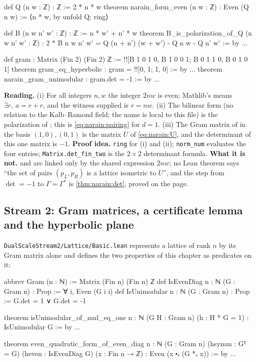 \begin{leancode}
def Q (n w : ℤ) : ℤ := 2 * n * w
theorem narain_form_even (n w : ℤ) : Even (Q n w) := ⟨n * w, by unfold Q; ring⟩

def B (n w n' w' : ℤ) : ℤ := n * w' + n' * w
theorem B_is_polarization_of_Q (n w n' w' : ℤ) :
    2 * B n w n' w' = Q (n + n') (w + w') - Q n w - Q n' w' := by ...

def gram : Matrix (Fin 2) (Fin 2) ℤ :=
  !![B 1 0 1 0, B 1 0 0 1; B 0 1 1 0, B 0 1 0 1]
theorem gram_eq_hyperbolic : gram = !![0, 1; 1, 0] := by ...
theorem narain_gram_unimodular : gram.det = -1 := by ...
\end{leancode}

\begin{leanbox}
\textbf{Reading.} (i) For all integers $n,w$ the integer $2nw$ is even; Mathlib's
 means $\exists r,\ a=r+r$, and the witness supplied is $r=nw$. (ii) The
bilinear form  (no relation to the Kalb--Ramond field; the name is local to this
file) is the polarization of ; this is \eqref{eq:narain:pairing} for $d=1$. (iii) The
Gram matrix of  in the basis $(1,0),(0,1)$ is the matrix $U$ of \eqref{eq:narain:U},
and the determinant of this one matrix is $-1$. \textbf{Proof idea.} \texttt{ring} for (i)
and (ii); \texttt{norm\_num} evaluates the four entries; \texttt{Matrix.det\_fin\_two} is the
$2\times2$ determinant formula. \textbf{What it is not.}  and  are linked only by the shared
expression $2nw$; no Lean theorem says ``the set of pairs $(p_L,p_R)$ is a lattice isometric
to $U$'', and the step from $\det=-1$ to $\Gamma=\Gamma^*$ is \cref{thm:narain:det}, proved
on the page.
\end{leanbox}

\subsection{Stream 2: Gram matrices, a certificate lemma and the hyperbolic plane}

\texttt{DualScaleStream2/Lattice/Basic.lean} represents a lattice of rank $n$ by its Gram
matrix alone and defines the two properties of this chapter as predicates on it:

\begin{leancode}
abbrev Gram (n : ℕ) := Matrix (Fin n) (Fin n) ℤ
def IsEvenDiag {n : ℕ} (G : Gram n) : Prop := ∀ i, Even (G i i)
def IsUnimodular {n : ℕ} (G : Gram n) : Prop := G.det = 1 ∨ G.det = -1

theorem isUnimodular_of_mul_eq_one {n : ℕ} (G H : Gram n) (h : H * G = 1) :
    IsUnimodular G := by ...

theorem even_quadratic_form_of_even_diag {n : ℕ} (G : Gram n)
    (hsymm : Gᵀ = G) (heven : IsEvenDiag G) (x : Fin n → ℤ) :
    Even (x ⬝ᵥ (G *ᵥ x)) := by ...
\end{leancode}

